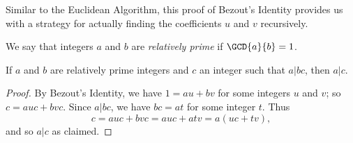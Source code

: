 \documentclass{article}
\begin{document}
Similar to the Euclidean Algorithm, this proof of Bezout's Identity provides us with a strategy for actually finding the coefficients $u$ and $v$ recursively.

\begin{dfn}
We say that integers $a$ and $b$ are \emph{relatively prime} if $\GCD{a}{b} = 1$.
\end{dfn}

\begin{thm}
If $a$ and $b$ are relatively prime integers and $c$ an integer such that $a | bc$, then $a|c$.
\end{thm}

\begin{proof}
By Bezout's Identity, we have $1 = au + bv$ for some integers $u$ and $v$; so $c = auc + bvc$. Since $a|bc$, we have $bc = at$ for some integer $t$. Thus \[ c = auc + bvc = auc + atv = a(uc + tv), \] and so $a|c$ as claimed.
\end{proof}
\end{document}
